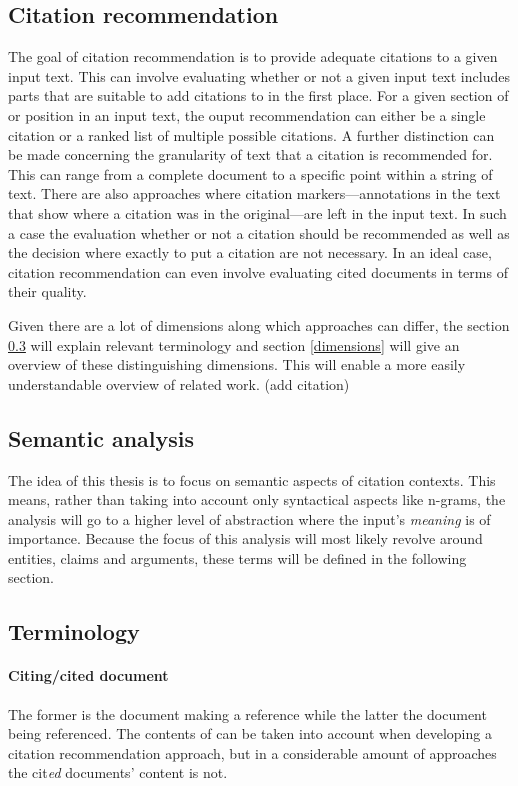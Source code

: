 \documentclass{proseminar}
\begin{document}
\subsection{Citation recommendation}
The goal of citation recommendation is to provide adequate citations to a given input text. This can involve evaluating whether or not a given input text includes parts that are suitable to add citations to in the first place. For a given section of or position in an input text, the ouput recommendation can either be a single citation or a ranked list of multiple possible citations. A further distinction can be made concerning the granularity of text that a citation is recommended for. This can range from a complete document to a specific point within a string of text. There are also approaches where citation markers---annotations in the text that show where a citation was in the original---are left in the input text. In such a case the evaluation whether or not a citation should be recommended as well as the decision where exactly to put a citation are not necessary. In an ideal case, citation recommendation can even involve evaluating cited documents in terms of their quality.

Given there are a lot of dimensions along which approaches can differ, the section \ref{terminology} will explain relevant terminology and section \ref{dimensions} will give an overview of these distinguishing dimensions. This will enable a more easily understandable overview of related work. (add citation)

\subsection{Semantic analysis}
The idea of this thesis is to focus on semantic aspects of citation contexts. This means, rather than taking into account only syntactical aspects like n-grams, the analysis will go to a higher level of abstraction where the input's \emph{meaning} is of importance. Because the focus of this analysis will most likely revolve around entities, claims and arguments, these terms will be defined in the following section.

\subsection{Terminology}\label{terminology}
\paragraph{Citing/cited document}
The former is the document making a reference while the latter the document being referenced. The contents of can be taken into account when developing a citation recommendation approach, but in a considerable amount of approaches the cit\emph{ed} documents' content is not.
\end{document}
